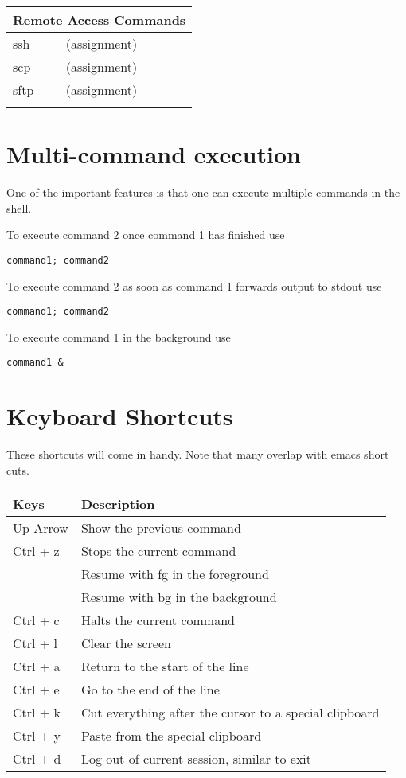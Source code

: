 \begin{center}
\begin{longtable}{|p{4cm}|p{8cm}|}
  \hline
  \multicolumn{2}{|l|}{\cellcolor{blue!15} Remote Access Commands}\\
  \hline
  ssh &  (assignment) \\
  scp &  (assignment) \\
  sftp &  (assignment) \\
  & \\


\end{longtable}
\end{center}

\section{Multi-command execution}

One of the important features is that one can execute multiple
commands in the shell.

To execute command 2 once command 1 has finished use

\begin{verbatim}
command1; command2
\end{verbatim}

To execute command 2 as soon as command 1 forwards output to stdout use

\begin{verbatim}
command1; command2
\end{verbatim}

To execute command 1 in the background use

\begin{verbatim}
command1 &
\end{verbatim}



\section{Keyboard Shortcuts}\label{keyboard-shortcuts}

These shortcuts will come in handy. Note that many overlap with emacs
short cuts.

\begin{tabular}{ll}
Keys     & Description  \\
\hline
Up Arrow & Show the previous command\\
Ctrl + z & Stops the current command  \\
         & Resume with fg in the foreground \\
         & Resume with bg in the background \\
Ctrl + c & Halts the current command\\
Ctrl + l & Clear the screen\\
Ctrl + a & Return to the start of the line\\
Ctrl + e & Go to the end of the line\\
Ctrl + k & Cut everything after the cursor to a special clipboard\\
Ctrl + y & Paste from the special clipboard \\
Ctrl + d & Log out of current session, similar to exit \\
\end{tabular}

